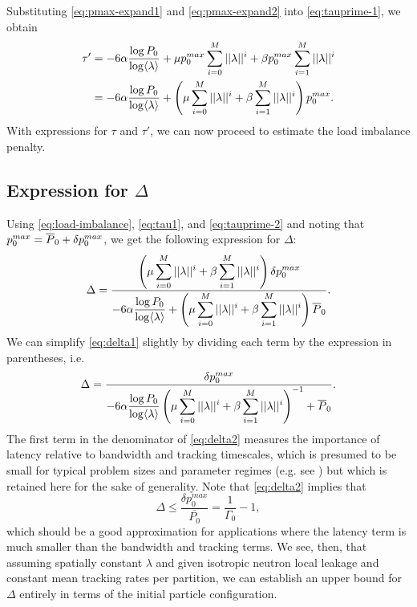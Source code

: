 Substituting \eqref{eq:pmax-expand1} and \eqref{eq:pmax-expand2} into
\eqref{eq:tauprime-1}, we obtain
\begin{align}
  \label{eq:tauprime-2}
  \tau' &= -6 \alpha \frac{\log P_0}{\log \langle \lambda \rangle} + \mu p_0^{max} \sum_{i=0}^M
  ||\lambda||^i + \beta p_0^{max} \sum_{i=1}^M ||\lambda||^i \nonumber \\
  &= -6 \alpha \frac{\log P_0}{\log \langle \lambda \rangle} + \left( \mu \sum_{i=0}^M
  ||\lambda||^i + \beta \sum_{i=1}^M ||\lambda||^i \right ) p_0^{max}.
\end{align}
With expressions for $\tau$ and $\tau'$, we can now proceed to estimate the load
imbalance penalty.

\subsection{Expression for \texorpdfstring{$\Delta$}{Delta}}

Using \eqref{eq:load-imbalance}, \eqref{eq:tau1}, and \eqref{eq:tauprime-2} and
noting that $p_0^{max} = \overline{P}_0 + \delta p_0^{max}$, we get the following
expression for $\Delta$:
\begin{equation}
  \label{eq:delta1}
  \Delta = \frac{\displaystyle \left( \mu \sum_{i=0}^M ||\lambda||^i + \beta
    \sum_{i=1}^M ||\lambda||^i \right ) \delta p_0^{max}}{\displaystyle -6
    \alpha \frac{\log P_0}{\log \langle \lambda \rangle} + \left ( \mu \sum_{i=0}^M ||\lambda||^i
    + \beta\sum_{i=1}^M ||\lambda||^i \right ) \overline{P}_0}.
\end{equation}
We can simplify \eqref{eq:delta1} slightly by dividing each term by the
expression in parentheses, i.e.
\begin{equation}
  \label{eq:delta2}
  \Delta = \frac{\delta p_0^{max}}{\displaystyle -6 \alpha \frac{\log P_0}{\log
        \langle \lambda \rangle} \left( \mu \sum_{i=0}^M ||\lambda||^i + \beta \sum_{i=1}^M
      ||\lambda||^i \right )^{-1} + \overline{P}_0}.
\end{equation}
The first term in the denominator of \eqref{eq:delta2} measures the importance
of latency relative to bandwidth and tracking timescales, which is presumed to
be small for typical problem sizes and parameter regimes (e.g. see
\cite{jcp-siegel-2012-1}) but which is retained here for the sake of generality.
Note that \eqref{eq:delta2} implies that
\begin{equation}
  \label{eq:delta3}
  \Delta \le \frac{\delta p_0^{max}}{\overline{P_0}} = \frac{1}{\Gamma_0} - 1,
\end{equation}
which should be a good approximation for applications where the latency term is
much smaller than the bandwidth and tracking terms. We see, then, that assuming
spatially constant $\lambda$ and given isotropic neutron local leakage and
constant mean tracking rates per partition, we can establish an upper bound for
$\Delta$ entirely in terms of the initial particle configuration.

